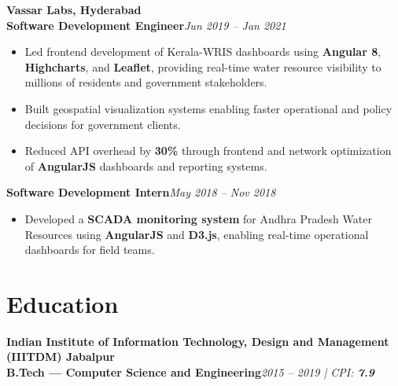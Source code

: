 \documentclass[a4paper,10pt]{article}
\newcommand{\companyfirst}[1]{\noindent\textbf{#1}\\[-2pt]}
\newcommand{\company}[1]{\vspace{4pt}\noindent\textbf{#1}\\[-2pt]}
\newcommand{\role}[2]{\textbf{#1}\hfill \textit{#2}\\[-3pt]}
\newcommand{\rolenext}[2]{\vspace{3pt}\textbf{#1}\hfill \textit{#2}\\[-3pt]}
\begin{document}
\company{Vassar Labs, Hyderabad}
\role{Software Development Engineer}{Jun 2019 -- Jan 2021}
\begin{itemize}
  \item Led frontend development of Kerala-WRIS dashboards using \textbf{Angular 8}, \textbf{Highcharts}, and \textbf{Leaflet}, providing real-time water resource visibility to millions of residents and government stakeholders.
  \item Built geospatial visualization systems enabling faster operational and policy decisions for government clients.
  \item Reduced API overhead by \textbf{30\%} through frontend and network optimization of \textbf{AngularJS} dashboards and reporting systems.
\end{itemize}

\rolenext{Software Development Intern}{May 2018 -- Nov 2018}
\begin{itemize}
  \item Developed a \textbf{SCADA monitoring system} for Andhra Pradesh Water Resources using \textbf{AngularJS} and \textbf{D3.js}, enabling real-time operational dashboards for field teams.
\end{itemize}

\section*{Education}
\companyfirst{Indian Institute of Information Technology, Design and Management (IIITDM) Jabalpur}
\role{B.Tech --- Computer Science and Engineering}{2015 -- 2019 \hspace{4pt} | \hspace{4pt} CPI: \textbf{7.9}}
\end{document}
